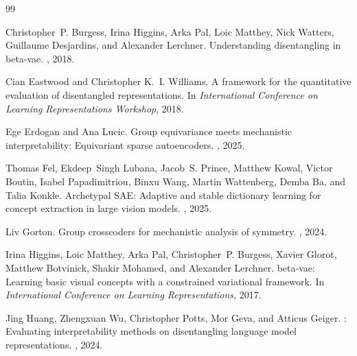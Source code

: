 \documentclass[10pt,twocolumn]{article}
\begin{document}

\begin{thebibliography}{99}

Christopher~P. Burgess, Irina Higgins, Arka Pal, Loic Matthey, Nick Watters,
  Guillaume Desjardins, and Alexander Lerchner.
\newblock Understanding disentangling in beta-vae.
, 2018.

Cian Eastwood and Christopher K.~I. Williams.
\newblock A framework for the quantitative evaluation of disentangled
  representations.
\newblock In {\em International Conference on Learning Representations
  Workshop}, 2018.

Ege Erdogan and Ana Lucic.
\newblock Group equivariance meets mechanistic interpretability: Equivariant
  sparse autoencoders.
, 2025.

Thomas Fel, Ekdeep~Singh Lubana, Jacob~S. Prince, Matthew Kowal, Victor
  Boutin, Isabel Papadimitriou, Binxu Wang, Martin Wattenberg, Demba Ba, and
  Talia Konkle.
\newblock Archetypal {SAE}: Adaptive and stable dictionary learning for concept
  extraction in large vision models.
, 2025.

Liv Gorton.
\newblock Group crosscoders for mechanistic analysis of symmetry.
, 2024.

Irina Higgins, Loic Matthey, Arka Pal, Christopher~P. Burgess, Xavier Glorot,
  Matthew Botvinick, Shakir Mohamed, and Alexander Lerchner.
\newblock beta-vae: Learning basic visual concepts with a constrained
  variational framework.
\newblock In {\em International Conference on Learning Representations}, 2017.

Jing Huang, Zhengxuan Wu, Christopher Potts, Mor Geva, and Atticus Geiger.
: Evaluating interpretability methods on disentangling
  language model representations.
, 2024.


\end{thebibliography}
\end{document}
